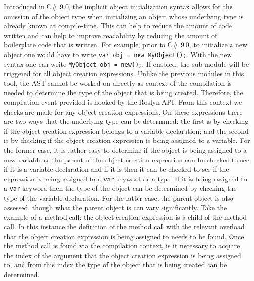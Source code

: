 Introduced in C\# 9.0, the implicit object initialization syntax allows for the omission of the object type when initializing an object whose underlying type is already known at compile-time. This can help to reduce the amount of code written and can help to improve readability by reducing the amount of boilerplate code that is written. For example, prior to C\# 9.0, to initialize a new object one would have to write \texttt{var obj = new MyObject();}. With the new syntax one can write \texttt{MyObject obj = new();}.
If enabled, the sub-module will be triggered for all object creation expressions. Unlike the previous modules in this tool, the AST cannot be worked on directly as context of the compilation is needed to determine the type of the object that is being created. Therefore, the compilation event provided is hooked by the Roslyn API. From this context we checks are made for any object creation expressions. On these expressions there are two ways that the underlying type can be determined: the first is by checking if the object creation expression belongs to a variable declaration; and the second is by checking if the object creation expression is being assigned to a variable.
For the former case, it is rather easy to determine if the object is being assigned to a new variable as the parent of the object creation expression can be checked to see if it is a variable declaration and if it is then it can be checked to see if the expression is being assigned to a \texttt{var} keyword or a type. If it is being assigned to a \texttt{var} keyword then the type of the object can be determined by checking the type of the variable declaration. For the latter case, the parent object is also assessed, though what the parent object is can vary significantly. Take the example of a method call: the object creation expression is a child of the method call. In this instance the definition of the method call with the relevant overload that the object creation expression is being assigned to needs to be found. Once the method call is found via the compilation context, is it necessary to acquire the index of the argument that the object creation expression is being assigned to, and from this index the type of the object that is being created can be determined.
